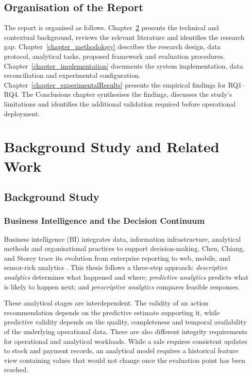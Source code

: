\documentclass[a4paper,11pt,oneside]{book}
\makeatletter
\def\cleardoublepage{\clearpage\if@twoside \ifodd\c@page\else
\hbox{}
\thispagestyle{empty}
\newpage
\if@twocolumn\hbox{}\newpage\fi\fi\fi}
\theoremstyle{plain}
\theoremstyle{definition}
\theoremstyle{remark}
\makeatother
\begin{document}
\section{Organisation of the Report}

The report is organised as follows. Chapter~\ref{chapter_backStudy}
presents the technical and contextual background, reviews the relevant
literature and identifies the research gap. Chapter~\ref{chapter_methodology}
describes the research design, data protocol, analytical tasks, proposed
framework and evaluation procedures. Chapter~\ref{chapter_implementation}
documents the system implementation, data reconciliation and experimental
configuration. Chapter~\ref{chapter_experimentalResults} presents the
empirical findings for RQ1--RQ4. The Conclusions chapter synthesises the
findings, discusses the study's limitations and identifies the additional
validation required before operational deployment.


\cleardoublepage
\chapter{Background Study and Related Work}
\label{chapter_backStudy}

\section{Background Study}

\subsection{Business Intelligence and the Decision Continuum}

Business intelligence (BI) integrates data, information infrastructure,
analytical methods and organisational practices to support decision-making. Chen, Chiang, and Storey trace its evolution from enterprise reporting to web, mobile, and sensor-rich analytics \cite{chen2012business}. This thesis follows a three-step approach: \emph{descriptive analytics} determines what happened and where; \emph{predictive analytics} predicts what is likely to happen next; and \emph{prescriptive analytics} compares feasible responses.

These analytical stages are interdependent. The validity of an action
recommendation depends on the predictive estimate supporting it, while
predictive validity depends on the quality, completeness and temporal
availability of the underlying operational data. There are also different integrity requirements for operational and analytical workloads. While a sale requires consistent updates to stock and payment records, an analytical model requires a historical feature view containing values that would not change once the evaluation point has been reached.
\end{document}
